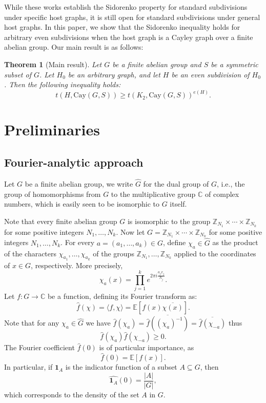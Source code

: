 \documentclass[12pt,a4paper]{article}
\newtheorem{theorem}{Theorem}[section]
\theoremstyle{definition}
\theoremstyle{plain}
\theoremstyle{definition}
\begin{document}
While these works establish the Sidorenko property for standard subdivisions under specific host graphs, it is still open for standard subdivisions under general host graphs. In this paper, we show that the Sidorenko inequality holds for arbitrary even subdivisions when the host graph is a Cayley graph over a finite abelian group. Our main result is as follows:

\begin{theorem}[Main result]\label{main}
Let $G$ be a finite abelian group and $S$ be a symmetric subset of $G$. Let $H_0$ be an arbitrary graph, and let $H$ be an even subdivision of $H_0$. Then the following inequality holds:
\[
        t(H,\mathrm{Cay}(G, S))\geq t(K_2,\mathrm{Cay}(G, S))^{e(H)}.
\]
\end{theorem}

\section{Preliminaries}
\subsection{Fourier-analytic approach}
Let $G$ be a finite abelian group, we write $\widehat{G}$ for the dual group of $G$, i.e., the group of homomorphisms from $G$ to the multiplicative group $\mathbb{C}$ of complex numbers, which is easily seen to be isomorphic to $G$ itself.

Note that every finite abelian group $G$ is isomorphic to the group $\mathbb{Z}_{N_1} \times \cdots \times \mathbb{Z}_{N_k}$ for some positive integers $N_1, \dots, N_k$. Now let $G = \mathbb{Z}_{N_1} \times \cdots \times \mathbb{Z}_{N_k}$ for some positive integers $N_1, \dots, N_k$. For every $a = (a_1, \dots, a_k) \in G$, define $\chi_a \in \widehat{G}$ as the product of the characters $\chi_{a_1}, \dots, \chi_{a_k}$ of the groups $\mathbb{Z}_{N_1}, \dots, \mathbb{Z}_{N_k}$ applied to the coordinates of $x \in G$, respectively. More precisely,
\[
\chi_a(x) = \prod_{j=1}^k e^{2\pi i \frac{a_j x_j}{N_j}}.
\]
Let $f: G\to \mathbb{C}$ be a function, defining its Fourier transform as:
\[
\widehat{f}(\chi) = \langle f, \chi \rangle = \mathbb{E}[f(x)\overline{\chi(x)}].
\]
Note that for any $\chi_a \in \widehat{G}$ we have $\widehat{f}(\chi_a) =\overline{\widehat{f}((\chi_a)^{-1}) }=\overline{\widehat{f}(\chi_{-a}) }$ thus  
\begin{equation}\label{pair}
    \widehat{f}(\chi_a)\widehat{f}(\chi_{-a})\geq 0. 
\end{equation}
The Fourier coefficient $\widehat{f}(0)$ is of particular importance, as
\[
\widehat{f}(0) = \mathbb{E}[f(x)].
\]
In particular, if $\mathbf{1}_A$ is the indicator function of a subset $A \subseteq G$, then
\[
\widehat{\mathbf{1}_A}(0) = \frac{|A|}{|G|},
\]
which corresponds to the density of the set $A$ in $G$.
\end{document}
